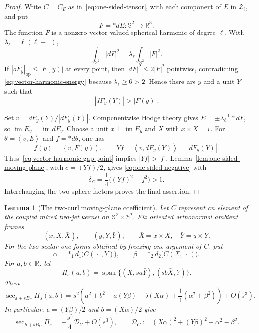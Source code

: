 \documentclass[11pt]{amsart}
\newtheorem{lemma}[theorem]{Lemma}
\theoremstyle{definition}
\theoremstyle{remark}
\DeclareMathOperator{\spanop}{span}
\DeclareMathOperator{\secop}{sec}
\newcommand{\R}{\mathbb R}
\newcommand{\Sph}{\mathbb S}
\newcommand{\ip}[2]{\left\langle #1,#2\right\rangle}
\begin{document}
\begin{proof}
Write $C=C_E$ as in~\eqref{eq:one-sided-tensor}, with each component
of $E$ in $\mathcal Z_\ell$, and put
\[
 F=*dE:\Sph^2\longrightarrow\R^3.
\]
The function $F$ is a nonzero vector-valued spherical harmonic of
degree $\ell$.  With $\lambda_\ell=\ell(\ell+1)$,
\begin{equation}\label{eq:vector-harmonic-energy}
 \int_{\Sph^2}|dF|^2
 =\lambda_\ell\int_{\Sph^2}|F|^2.
\end{equation}
If $|dF_y|_{\mathrm{op}}\leq|F(y)|$ at every point, then
$|dF|^2\leq2|F|^2$ pointwise, contradicting
\eqref{eq:vector-harmonic-energy} because
$\lambda_\ell\geq6>2$.  Hence there are $y$ and a unit $Y$ such that
\begin{equation}\label{eq:vector-harmonic-gap-point}
 |dF_y(Y)|>|F(y)|.
\end{equation}

Set $v=dF_y(Y)/|dF_y(Y)|$.  Componentwise Hodge theory gives
$E=\pm\lambda_\ell^{-1}*dF$, so
$\operatorname{im}E_y=\operatorname{im}dF_y$.  Choose a unit
$x\perp\operatorname{im}E_y$ and $X$ with $x\times X=v$.  For
$\theta=\ip{v}{E}$ and $f=*d\theta$, one has
\[
 f(y)=\ip{v}{F(y)},
 \qquad
 Yf=\ip{v}{dF_y(Y)}=|dF_y(Y)|.
\]
Thus~\eqref{eq:vector-harmonic-gap-point} implies $|Yf|>|f|$.
Lemma~\ref{lem:one-sided-moving-plane}, with $c=(Yf)/2$, gives
\eqref{eq:one-sided-negative} with
\[
 \delta_C=\frac14\bigl((Yf)^2-f^2\bigr)>0.
\]
Interchanging the two sphere factors proves the final assertion.
\end{proof}

\begin{lemma}[The two-curl moving-plane coefficient]
\label{lem:two-curl-moving-plane}
Let $C$ represent an element of the coupled mixed two-jet kernel on
$\Sph^2\times\Sph^2$.  Fix oriented orthonormal ambient frames
\[
 (x,X,\bar X),\qquad (y,Y,\bar Y),
 \qquad
 \bar X=x\times X,\quad \bar Y=y\times Y.
\]
For the two scalar one-forms obtained by freezing one argument of $C$,
put
\begin{equation}\label{eq:two-factor-curls}
 \alpha=*_{1}d_1\bigl(C(\,\cdot\,,Y)\bigr),
 \qquad
 \beta=*_{2}d_2\bigl(C(X,\,\cdot\,)\bigr).
\end{equation}
For $a,b\in\R$, let
\begin{equation}\label{eq:two-parameter-moving-plane}
 \Pi_s(a,b)=
 \spanop\{(X,sa\bar Y),(sb\bar X,Y)\}.
\end{equation}
Then
\begin{equation}\label{eq:two-curl-coefficient}
 \secop_{h+sB_C}\Pi_s(a,b)
 =s^2\left(
 a^2+b^2-a(Y\beta)-b(X\alpha)
 +\frac14(\alpha^2+\beta^2)\right)+O(s^3).
\end{equation}
In particular, $a=(Y\beta)/2$ and $b=(X\alpha)/2$ give
\begin{equation}\label{eq:two-curl-optimized}
 \secop_{h+sB_C}\Pi_s
 =-\frac{s^2}{4}\mathcal D_C+O(s^3),
 \qquad
 \mathcal D_C:=(X\alpha)^2+(Y\beta)^2-\alpha^2-\beta^2.
\end{equation}
\end{lemma}
\end{document}
